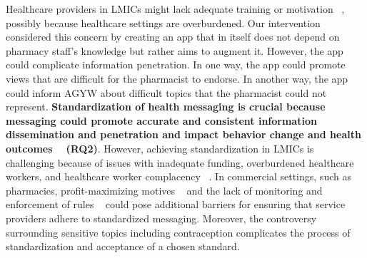 Healthcare providers in LMICs might lack adequate training or motivation ~\cite{scott2016non, bitton2017primary}, possibly because healthcare settings are overburdened. Our intervention considered this concern by creating an app that in itself does not depend on pharmacy staff’s knowledge but rather aims to augment it. However, the app could complicate information penetration. In one way, the app could promote views that are difficult for the pharmacist to endorse. In another way, the app could inform AGYW about difficult topics that the pharmacist could not represent.  \textbf{Standardization of health messaging is crucial because messaging could promote accurate and consistent information dissemination and penetration and impact behavior change and health outcomes ~\cite{agha2010intentions, mwaikambo2011works} (RQ2)}. However, achieving standardization in LMICs is challenging because of issues with inadequate funding, overburdened healthcare workers, and healthcare worker complacency ~\cite{adovor2021medical}. In commercial settings, such as pharmacies, profit-maximizing motives ~\cite{wulandari2021prevalence, miller2016performance} and the lack of monitoring and enforcement of rules ~\cite{wulandari2021prevalence} could pose additional barriers for ensuring that service providers adhere to standardized messaging. Moreover, the controversy surrounding sensitive topics including contraception complicates the process of standardization and acceptance of a chosen standard.

